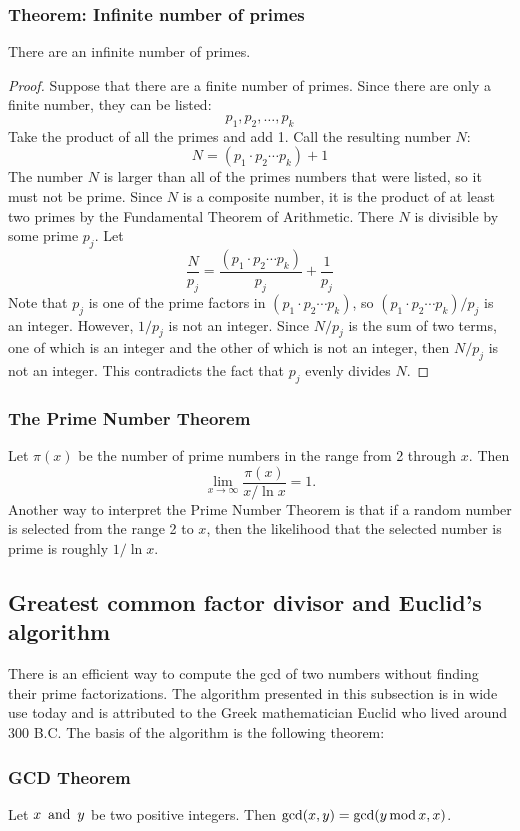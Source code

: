 \subsubsection*{Theorem: Infinite number of primes}
There are an infinite number of primes.
\begin{proof}
  Suppose that there are a finite number of primes. Since there are only a finite number, they can be listed:
  \[
    p_1,p_2,\ldots,p_k
  \]
  Take the product of all the primes and add 1. Call the resulting number $N$:
  \[
    N = (p_1 \cdot p_2 \cdots p_k) + 1
  \]
  The number $N$ is larger than all of the primes numbers that were listed, so it must not be prime. Since $N$ is a composite number, it is the product of at least two primes by the Fundamental Theorem of Arithmetic. There $N$ is divisible by some prime $p_j$. Let
  \[
    \frac{N}{p_j} = \frac{(p_1 \cdot p_2 \cdots p_k)}{p_j} + \frac{1}{p_j}
  \]
  Note that $p_j$ is one of the prime factors in $(p_1 \cdot p_2 \cdots p_k)$, so $(p_1 \cdot p_2 \cdots p_k)/p_j$ is an integer. However, $1/p_j$ is not an integer. Since $N/p_j$ is the sum of two terms, one of which is an integer and the other of which is not an integer, then $N/p_j$ is not an integer. This contradicts the fact that $p_j$ evenly divides $N$.
\end{proof}

\subsubsection*{The Prime Number Theorem}
Let $\pi(x)$ be the number of prime numbers in the range from 2 through $x$. Then
\[
  \lim_{x \rightarrow \infty} \frac{\pi(x)}{x/\ln x} = 1.
\]
Another way to interpret the Prime Number Theorem is that if a random number is selected from the range 2 to $x$, then the likelihood that the selected number is prime is roughly $1/\ln x$.

\subsection{Greatest common factor divisor and Euclid's algorithm}
There is an efficient way to compute the gcd of two numbers without finding their prime factorizations. The algorithm presented in this subsection is in wide use today and is attributed to the Greek mathematician Euclid who lived around 300 B.C. The basis of the algorithm is the following theorem:

\subsubsection*{GCD Theorem}
Let $x \operatorname{~\text{and}~} y$ be two positive integers. Then $\gcd(x,y) = \gcd(y \operatorname{\text{mod}} x, x)$.

